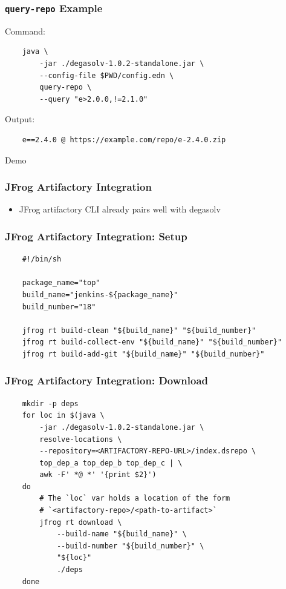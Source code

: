 \documentclass{beamer}
\begin{document}
\begin{frame}[fragile]
  \frametitle{\texttt{query-repo} Example}
  Command:
\begin{verbatim}
    java \
        -jar ./degasolv-1.0.2-standalone.jar \
        --config-file $PWD/config.edn \
        query-repo \
        --query "e>2.0.0,!=2.1.0"
\end{verbatim}
  Output:
\begin{verbatim}
    e==2.4.0 @ https://example.com/repo/e-2.4.0.zip
\end{verbatim}
\end{frame}
\begin{frame}
  \centerline{\color{blue}\Large Demo}
\end{frame}
\begin{frame}[fragile]
  \frametitle{JFrog Artifactory Integration}
  \begin{itemize}
  \item JFrog artifactory CLI already pairs well with degasolv
  \end{itemize}
\end{frame}
\begin{frame}[fragile]
\frametitle{JFrog Artifactory Integration: Setup}
\begin{verbatim}
    #!/bin/sh

    package_name="top"
    build_name="jenkins-${package_name}"
    build_number="18"

    jfrog rt build-clean "${build_name}" "${build_number}"
    jfrog rt build-collect-env "${build_name}" "${build_number}"
    jfrog rt build-add-git "${build_name}" "${build_number}"
\end{verbatim}
\end{frame}
\begin{frame}[fragile]
\frametitle{JFrog Artifactory Integration: Download}
\begin{verbatim}
    mkdir -p deps
    for loc in $(java \
        -jar ./degasolv-1.0.2-standalone.jar \
        resolve-locations \
        --repository=<ARTIFACTORY-REPO-URL>/index.dsrepo \
        top_dep_a top_dep_b top_dep_c | \
        awk -F' *@ *' '{print $2}')
    do
        # The `loc` var holds a location of the form
        # `<artifactory-repo>/<path-to-artifact>`
        jfrog rt download \
            --build-name "${build_name}" \
            --build-number "${build_number}" \
            "${loc}"
            ./deps
    done
\end{verbatim}
\end{frame}
\end{document}
